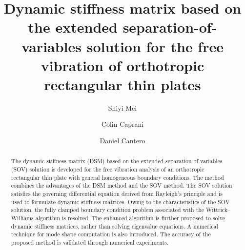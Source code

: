 \documentclass[preprint,12pt]{elsarticle}
\begin{document}
\begin{frontmatter}
\title{Dynamic stiffness matrix based on the extended separation-of-variables solution for the free vibration of orthotropic rectangular thin plates}
\author[1]{Shiyi Mei}
\author[1]{Colin Caprani}
\author[2]{Daniel Cantero}
\begin{abstract}
The dynamic stiffness matrix (DSM) based on the extended separation-of-variables (SOV) solution is developed for the free vibration analysis of an orthotropic rectangular thin plate with general homogeneous boundary conditions.  
The method combines the advantages of the DSM method and the SOV method.
The SOV solution satisfies the governing differential equation derived from Rayleigh’s principle and is used to formulate dynamic stiffness matrices.
Owing to the characteristics of the SOV solution, the fully clamped boundary condition problem associated with the Wittrick–Williams algorithm is resolved. 
The enhanced algorithm is further proposed to solve dynamic stiffness matrices, rather than solving eigenvalue equations.
A numerical technique for mode shape computation is also introduced.
The accuracy of the proposed method is validated through numerical experiments.
  
\end{abstract}
\end{frontmatter}
\linenumbers
\end{document}
